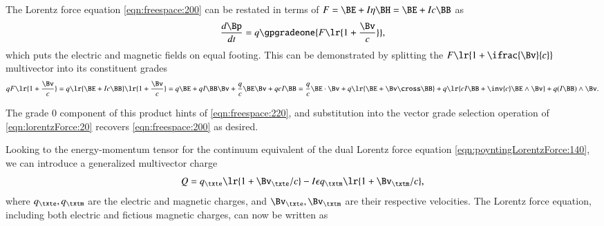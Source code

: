 %
%
The Lorentz force equation \cref{eqn:freespace:200}
can be restated
in terms of \( F = \BE + I \eta \BH = \BE + I c \BB \) as
\begin{dmath}\label{eqn:lorentzForce:20}
\frac{d\Bp}{dt} = q \gpgradeone{ F \lr{ 1 + \frac{\Bv}{c} } },
\end{dmath}
which puts the electric and magnetic fields on equal footing.
This can be demonstrated by splitting the \( F \lr{ 1 + \ifrac{\Bv}{c} } \) multivector into its constituent grades
\begin{dmath}\label{eqn:lorentzForce:40}
q F \lr{ 1 + \frac{\Bv}{c} }
=
q
\lr{ \BE + I c \BB }
\lr{ 1 + \frac{\Bv}{c} }
=
q \BE
+ q I \BB \Bv
+ \frac{q}{c} \BE \Bv
+ q c I \BB
=
  \frac{q}{c} \BE \cdot \Bv
+ q \lr{ \BE + \Bv \cross \BB }
+ q \lr{ c I \BB + \inv{c} \BE \wedge \Bv }
+ q (I \BB) \wedge \Bv.
\end{dmath}

The grade 0 component of this product hints of \cref{eqn:freespace:220}, and substitution into the vector grade selection operation of \cref{eqn:lorentzForce:20} recovers \cref{eqn:freespace:200} as desired.

Looking to the energy-momentum tensor for the continuum equivalent of the dual Lorentz force equation \cref{eqn:poyntingLorentzForce:140}, we can introduce a generalized multivector charge
\begin{dmath}\label{eqn:lorentzForce:240}
Q =
q_\txte \lr{ 1 + \Bv_\txte/c }
-I \epsilon q_\txtm \lr{ 1 + \Bv_\txtm/c },
\end{dmath}
where \( q_\txte, q_\txtm \) are the electric and magnetic charges, and \( \Bv_\txte, \Bv_\txtm \) are their respective velocities.
The Lorentz force equation, including both electric and fictious magnetic charges, can now be written as
